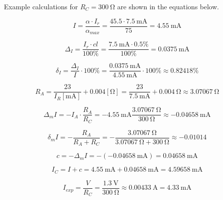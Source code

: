 Example calculations for $R_C = \SI{300}{\ohm}$ are shown in the equations below.

\begin{equation}
	I = \frac{\alpha\cdot I_r}{\alpha_{max}} = \frac{45.5\cdot \SI{7.5}{\milli\ampere}}{75} = \SI{4.55}{\milli\ampere}
\end{equation}

\begin{equation}
	\Delta_I = \frac{I_r\cdot cl}{100\unit{\percent}} = \frac{\SI{7.5}{\milli\ampere}\cdot 0.5\unit{\percent}}{100\unit{\percent}} = \SI{0.0375}{\milli\ampere}
\end{equation}

\begin{equation}
	\delta_I = \frac{\Delta_I}{I}\cdot 100\unit{\percent} = \frac{\SI{0.0375}{\milli\ampere}}{\SI{4.55}{\milli\ampere}}\cdot 100\unit{\percent} \approx 0.82418\unit{\percent}
\end{equation}

\begin{equation}
	R_A = \frac{23}{I_R  [\unit{\milli\ampere}]} + 0.004 [\unit{\ohm}] = \frac{23}{\SI{7.5}{\milli\ampere}} + \SI{0.004}{\ohm} \approx \SI{3.07067}{\ohm}
\end{equation}

\begin{equation}
	\Delta_m I = -I_A \cdot\frac{R_A}{R_C} = -\SI{4.55}{\milli\ampere}\frac{\SI{3.07067}{\ohm}}{\SI{300}{\ohm}} \approx -\SI{0.04658}{\milli\ampere}
\end{equation}

\begin{equation}
	\delta_m I = -\frac{R_A}{R_A + R_C} = -\frac{\SI{3.07067}{\ohm}}{\SI{3.07067}{\ohm} + \SI{300}{\ohm}} \approx -0.01014
\end{equation}

\begin{equation}
	c = -\Delta_m I = -(-\SI{0.04658}{\milli\ampere}) = \SI{0.04658}{\milli\ampere}
\end{equation}

\begin{equation}
	I_C = I + c = \SI{4.55}{\milli\ampere} +\SI{0.04658}{\milli\ampere} = \SI{4.59658}{\milli\ampere}
\end{equation}

\begin{equation}
	I_{exp} = \frac{V}{R_C} = \frac{\SI{1.3}{\volt}}{\SI{300}{\ohm}} \approx \SI{0.00433}{\ampere} = \SI{4.33}{\milli\ampere}
\end{equation}

